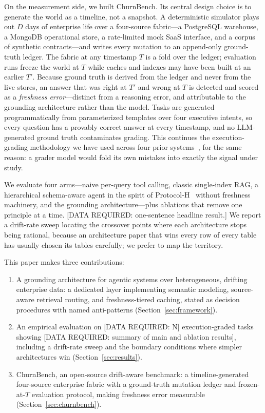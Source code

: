 \documentclass{ieeeaccess}
\begin{document}
On the measurement side, we built ChurnBench. Its central design choice is to
generate the world as a timeline, not a snapshot. A deterministic simulator plays
out $D$ days of enterprise life over a four-source fabric---a PostgreSQL warehouse,
a MongoDB operational store, a rate-limited mock SaaS interface, and a corpus of
synthetic contracts---and writes every mutation to an append-only ground-truth
ledger. The fabric at any timestamp $T$ is a fold over the ledger; evaluation runs
freeze the world at $T$ while caches and indexes may have been built at an earlier
$T'$. Because ground truth is derived from the ledger and never from the live
stores, an answer that was right at $T'$ and wrong at $T$ is detected and scored as
a \emph{freshness error}---distinct from a reasoning error, and attributable to the
grounding architecture rather than the model. Tasks are generated programmatically
from parameterized templates over four executive intents, so every question has a
provably correct answer at every timestamp, and no LLM-generated ground truth
contaminates grading. This continues the execution-grading methodology we have used
across four prior systems~\cite{par, tca, saasrat, gte}, for the same reason: a
grader model would fold its own mistakes into exactly the signal under study.

We evaluate four arms---naive per-query tool calling, classic single-index RAG, a
hierarchical schema-aware agent in the spirit of Protocol-H~\cite{protocolh} without
freshness machinery, and the grounding architecture---plus ablations that remove one
principle at a time. [DATA REQUIRED: one-sentence headline result.] We report a
drift-rate sweep locating the crossover points where each architecture stops being
rational, because an architecture paper that wins every row of every table has
usually chosen its tables carefully; we prefer to map the territory.

This paper makes three contributions:
\begin{enumerate}
\item A grounding architecture for agentic systems over heterogeneous, drifting
enterprise data: a dedicated layer implementing semantic modeling, source-aware
retrieval routing, and freshness-tiered caching, stated as decision procedures with
named anti-patterns (Section~\ref{sec:framework}).
\item An empirical evaluation on [DATA REQUIRED: N] execution-graded tasks showing
[DATA REQUIRED: summary of main and ablation results], including a drift-rate sweep
and the boundary conditions where simpler architectures win
(Section~\ref{sec:results}).
\item ChurnBench, an open-source drift-aware benchmark: a timeline-generated
four-source enterprise fabric with a ground-truth mutation ledger and frozen-at-$T$
evaluation protocol, making freshness error measurable
(Section~\ref{sec:churnbench}).
\end{enumerate}
\end{document}
